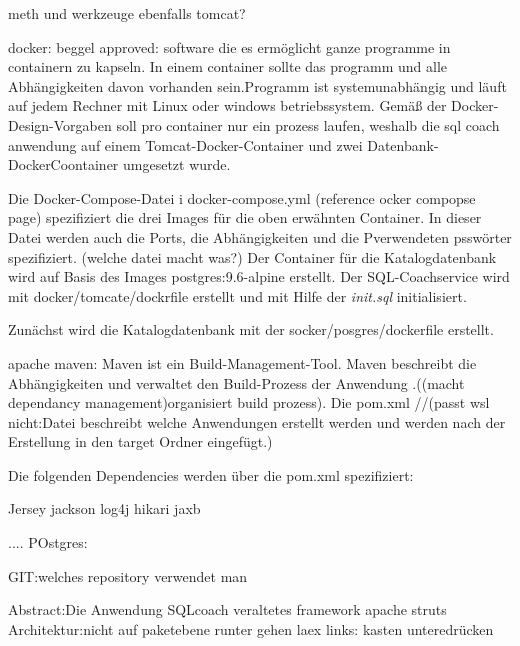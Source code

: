 \documentclass[fleqn,10pt,ngerman]{SelfArx}
\begin{document}
meth und werkzeuge ebenfalls tomcat?

docker: beggel approved:	
 software die es ermöglicht ganze programme in containern zu kapseln. In einem container sollte das programm und alle Abhängigkeiten davon vorhanden sein.Programm ist systemunabhängig und läuft auf jedem Rechner mit Linux oder windows betriebssystem. Gemäß der Docker-Design-Vorgaben soll pro container nur ein prozess laufen, weshalb die sql coach anwendung auf einem Tomcat-Docker-Container und zwei Datenbank-DockerCoontainer umgesetzt wurde.
 
 
 
 Die Docker-Compose-Datei i docker-compose.yml (reference ocker compopse page) spezifiziert die drei Images für die  oben erwähnten Container. In dieser Datei werden auch die Ports, die Abhängigkeiten und die Pverwendeten psswörter spezifiziert. (welche datei macht was?)
Der Container für die Katalogdatenbank wird auf Basis des Images postgres:9.6-alpine erstellt. Der SQL-Coachservice wird mit docker/tomcate/dockrfile erstellt und mit Hilfe der  \textit{init\database.sql} initialisiert. 

Zunächst wird die Katalogdatenbank mit der socker/posgres/dockerfile erstellt.

apache maven:
Maven ist ein Build-Management-Tool. Maven beschreibt die Abhängigkeiten und verwaltet den Build-Prozess der Anwendung .((macht dependancy management)organisiert build prozess).
Die pom.xml //(passt wsl nicht:Datei beschreibt welche Anwendungen erstellt werden und werden nach der Erstellung in den target Ordner eingefügt.) 

Die folgenden Dependencies werden über die pom.xml spezifiziert:

Jersey
jackson
log4j
hikari
jaxb

....
POstgres:

GIT:welches repository verwendet man


Abstract:Die Anwendung SQLcoach veraltetes framework apache struts
Architektur:nicht auf paketebene runter gehen
laex links: kasten unteredrücken
\usepackage[hidelinks]{hyperref}
\end{document}
